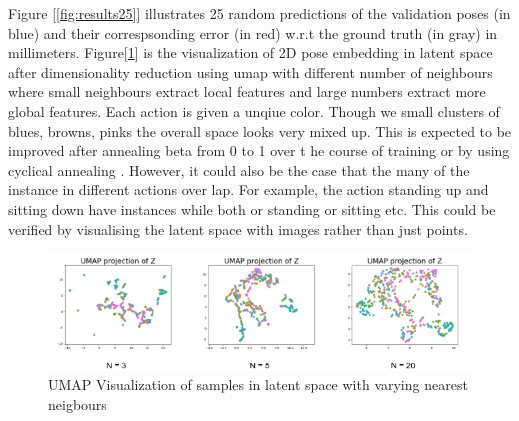 Figure [\ref{fig:results25}] illustrates 25 random predictions of the validation poses (in blue) and their correspsonding error (in red) w.r.t the ground truth (in gray) in millimeters. Figure[\ref{fig:latentspace}] is the visualization of 2D pose embedding in latent space after dimensionality reduction using \ac{umap} with different number of neighbours where small neighbours extract local features and large numbers extract more global features. Each action is given a unqiue color. Though we small clusters of blues, browns, pinks the overall space looks very mixed up. This is expected to be improved after annealing beta from 0 to 1 over t he course of training or by using cyclical annealing \cite{cyclicbeta}. However, it could also be the case that the many of the instance in different actions over lap. For example, the action standing up and sitting down have instances while both or standing or sitting etc. This could be verified by visualising the latent space with images rather than just points.  

\begin{figure}[h]
    \centering
    \includegraphics[width=\textwidth]{figures/latentspace.png}
    \caption{UMAP Visualization of samples in latent space with varying nearest neigbours}
    \label{fig:latentspace}
\end{figure}